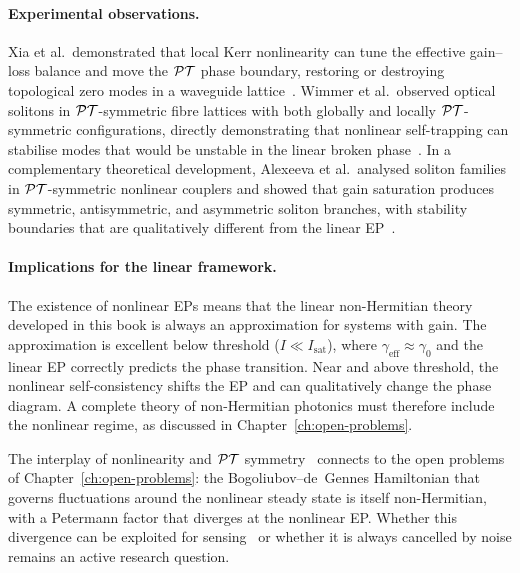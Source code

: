 \paragraph{Experimental observations.}
Xia et al.\ demonstrated that local Kerr nonlinearity can tune the
effective gain--loss balance and move the $\mathcal{PT}$ phase boundary, restoring
or destroying topological zero modes in a waveguide
lattice~\cite{xia2021nonlinear}. Wimmer et al.\ observed optical
solitons in $\mathcal{PT}$-symmetric fibre lattices with both globally and locally
$\mathcal{PT}$-symmetric configurations, directly demonstrating that nonlinear
self-trapping can stabilise modes that would be unstable in the linear
broken phase~\cite{wimmer2015observation}. In a complementary theoretical
development, Alexeeva et al.\ analysed soliton families in
$\mathcal{PT}$-symmetric nonlinear couplers and showed that gain saturation
produces symmetric, antisymmetric, and asymmetric soliton branches, with
stability boundaries that are
qualitatively different from the linear EP~\cite{alexeeva2012optical}.

\paragraph{Implications for the linear framework.}
The existence of nonlinear EPs means that the linear non-Hermitian
theory developed in this book is always an approximation for systems
with gain. The approximation is excellent below threshold
($I \ll I_{\mathrm{sat}}$), where $\gamma_{\mathrm{eff}} \approx
\gamma_0$ and the linear EP correctly predicts the phase transition.
Near and above threshold, the nonlinear self-consistency shifts the EP
and can qualitatively change the phase diagram. A complete theory of
non-Hermitian photonics must therefore include the nonlinear regime,
as discussed in Chapter~\ref{ch:open-problems}.

The interplay of nonlinearity and $\mathcal{PT}$ symmetry~\cite{longhi2018parity,hill2026exceptional,bender1998real} connects to the open
problems of Chapter~\ref{ch:open-problems}: the Bogoliubov--de~Gennes
Hamiltonian that governs fluctuations around the nonlinear steady state
is itself non-Hermitian, with a Petermann factor that diverges at the
nonlinear EP. Whether this divergence can be exploited for sensing~\cite{smith2020beyond} or
whether it is always cancelled by noise remains an active research
question.
